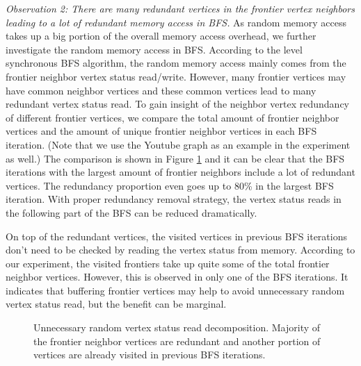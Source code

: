 \textit{Observation 2: There are many redundant vertices in the 
frontier vertex neighbors leading to a lot of redundant memory access in BFS.} 
As random memory access takes up a big portion of the overall memory 
access overhead, we further investigate the random memory access in BFS. 
According to the level synchronous BFS algorithm, the random memory access mainly comes 
from the frontier neighbor vertex status read/write. 
However, many frontier vertices may have common neighbor vertices and these common 
vertices lead to many redundant vertex status read. To gain insight of the neighbor 
vertex redundancy of different frontier vertices, we compare the total amount of frontier 
neighbor vertices and the amount of unique frontier neighbor vertices in each BFS iteration.
(Note that we use the Youtube graph as an example in the experiment as well.) 
The comparison is shown in Figure \ref{fig:repeat-neighbor} and it can be clear that 
the BFS iterations with the largest amount of frontier neighbors include a lot of redundant 
vertices. The redundancy proportion even goes up to 80\% in the largest BFS iteration. 
With proper redundancy removal strategy,
the vertex status reads in the following part of the BFS can be reduced dramatically.

On top of the redundant vertices, the visited vertices in previous 
BFS iterations don't need to be checked by reading the vertex status 
from memory. According to our experiment, the visited frontiers 
take up quite some of the total frontier neighbor vertices. However, this is 
observed in only one of the BFS iterations. It indicates that buffering 
frontier vertices may help to avoid unnecessary random vertex status read, 
but the benefit can be marginal.    

\begin{figure}
\caption{Unnecessary random vertex status read decomposition. 
    Majority of the frontier neighbor vertices are 
    redundant and another portion of vertices are already 
    visited in previous BFS iterations.}
\label{fig:repeat-neighbor}
\end{figure}

